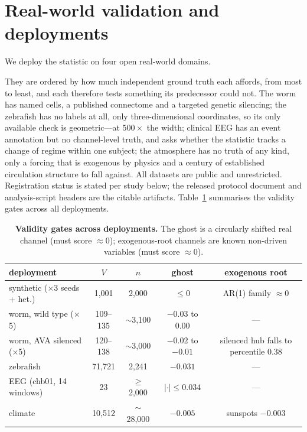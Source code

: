 \documentclass[11pt]{article}
\begin{document}
\section{Real-world validation and deployments}
\label{sec:real}

We deploy the statistic on four open real-world domains.

They are ordered by how much independent ground truth each affords, from most to least, and each therefore tests something its predecessor could not. The worm has named cells, a published connectome and a targeted genetic silencing; the zebrafish has no labels at all, only three-dimensional coordinates, so its only available check is geometric---at $500\times$ the width; clinical EEG has an event annotation but no channel-level truth, and asks whether the statistic tracks a change of regime within one subject; the atmosphere has no truth of any kind, only a forcing that is exogenous by physics and a century of established circulation structure to fall against. All datasets
are public and unrestricted. Registration status is stated per study
below; the released protocol document and analysis-script headers
are the citable artifacts. Table~\ref{tab:gates} summarises the validity
gates across all deployments.

\begin{table}[t]
\centering
\caption{\textbf{Validity gates across deployments.} The ghost is a
circularly shifted real channel (must score $\approx 0$); exogenous-root
channels are known non-driven variables (must score $\approx 0$).}
\label{tab:gates}
\small
\begin{tabular}{lcccc}
\toprule
deployment & $V$ & $n$ & ghost & exogenous root\\
\midrule
synthetic ($\times$3 seeds + het.) & 1{,}001 & 2{,}000 & $\leq 0$ & AR(1)
family $\approx 0$\\
worm, wild type ($\times$5) & 109--135 & $\sim$3{,}100 & $-0.03$ to
$0.00$ & ---\\
worm, AVA silenced ($\times$5) & 120--138 & $\sim$3{,}000 & $-0.02$ to
$-0.01$ & silenced hub falls to percentile 0.38\\
zebrafish & 71{,}721 & 2{,}241 & $-0.031$ & ---\\
EEG (chb01, 14 windows) & 23 & $\geq$2{,}000 & $|{\cdot}|\leq0.034$ &
---\\
climate & 10{,}512 & $\sim$28{,}000 & $-0.005$ & sunspots $-0.003$\\
\bottomrule
\end{tabular}
\end{table}
\end{document}
